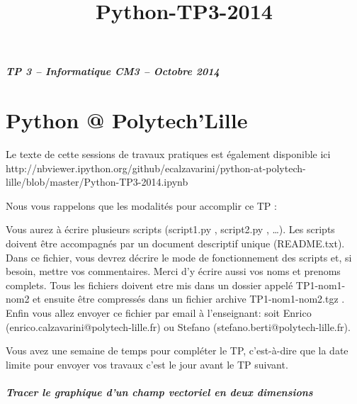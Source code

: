 \documentclass{article}
\title{Python-TP3-2014}
\begin{document}
    
    
    \maketitle
    
    

    

    \subparagraph{TP 3 -- Informatique CM3 -- Octobre 2014}



    \section{Python @ Polytech'Lille}


    Le texte de cette sessions de travaux pratiques est également disponible
ici
http://nbviewer.ipython.org/github/ecalzavarini/python-at-polytech-lille/blob/master/Python-TP3-2014.ipynb

    Nous vous rappelons que les modalités pour accomplir ce TP :

Vous aurez à écrire plusieurs scripts (script1.py , script2.py ,
\ldots{}). Les scripts doivent être accompagnés par un document
descriptif unique (README.txt). Dans ce fichier, vous devrez décrire le
mode de fonctionnement des scripts et, si besoin, mettre vos
commentaires. Merci d'y écrire aussi vos noms et prenoms complets. Tous
les fichiers doivent etre mis dans un dossier appelé TP1-nom1-nom2 et
ensuite être compressés dans un fichier archive TP1-nom1-nom2.tgz .
Enfin vous allez envoyer ce fichier par email à l'enseignant: soit
Enrico (enrico.calzavarini@polytech-lille.fr) ou Stefano
(stefano.berti@polytech-lille.fr).

Vous avez une semaine de temps pour compléter le TP, c'est-à-dire que la
date limite pour envoyer vos travaux c'est le jour avant le TP suivant.


    \subparagraph{Tracer le graphique d'un champ vectoriel en deux dimensions}
\end{document}
